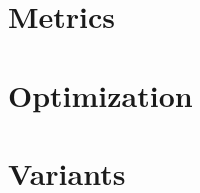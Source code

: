 \documentclass[a4paper]{twentysecondcv} %
\begin{document}
\vspace{-0.5cm}

\section{Metrics}

\begin{twentyshort} %

\end{twentyshort}



\section{Optimization}

\begin{twentyshort} %

\end{twentyshort}



\section{Variants}

\begin{twenty} %

\end{twenty}


\end{document}
